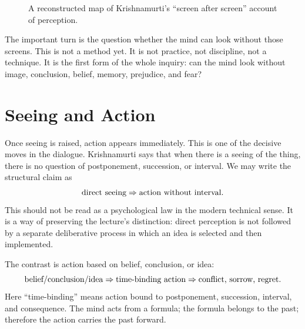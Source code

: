 \begin{figure}
\centering
{}
\caption{A reconstructed map of Krishnamurti's ``screen after screen'' account of perception.}
\end{figure}

The important turn is the question whether the mind can look without those screens. This is not a method yet. It is not practice, not discipline, not a technique. It is the first form of the whole inquiry: can the mind look without image, conclusion, belief, memory, prejudice, and fear?

\section{Seeing and Action}

Once seeing is raised, action appears immediately. This is one of the decisive moves in the dialogue. Krishnamurti says that when there is a seeing of the thing, there is no question of postponement, succession, or interval. We may write the structural claim as
\begin{equation}
\hbox{direct seeing} \Rightarrow \hbox{action without interval}.
\end{equation}
This should not be read as a psychological law in the modern technical sense. It is a way of preserving the lecture's distinction: direct perception is not followed by a separate deliberative process in which an idea is selected and then implemented.

The contrast is action based on belief, conclusion, or idea:
\begin{equation}
\hbox{belief/conclusion/idea}
\Rightarrow
\hbox{time-binding action}
\Rightarrow
\hbox{conflict, sorrow, regret}.
\end{equation}
Here ``time-binding'' means action bound to postponement, succession, interval, and consequence. The mind acts from a formula; the formula belongs to the past; therefore the action carries the past forward.

